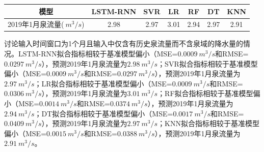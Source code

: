 \begin{table}[!htbp]
  \centering
  \label{tab:spr_pre_only_out_1}
  \footnotesize
  \renewcommand{\arraystretch}{1}
  \begin{tabular}{ccccccc}
    \toprule
    模型 & LSTM-RNN & SVR & LR & RF & DT & KNN\\
    \midrule 
    2019年1月泉流量($\SI{}{m^{3}/s}$) & 2.98 & 2.97 & 3.01 & 2.94 & 2.97 & 2.91 \\
    \bottomrule
  \end{tabular}
\end{table}

讨论输入时间窗口为1个月且输入中仅含有历史泉流量而不含泉域的降水量的情况。LSTM-RNN拟合指标相较于基准模型偏小（MSE=$\SI{0.0009}{m^{3}/s}$和RMSE=$\SI{0.0297}{m^{3}/s}$），预测2019年1月泉流量为$\SI{2.98}{m^{3}/s}$；SVR拟合指标相较于基准模型偏小（MSE=$\SI{0.0009}{m^{3}/s}$和RMSE=$\SI{0.0297}{m^{3}/s}$），预测2019年1月泉流量为$\SI{2.97}{m^{3}/s}$；LR拟合指标相较于基准模型偏小（MSE=$\SI{0.0009}{m^{3}/s}$和RMSE=$\SI{0.0306}{m^{3}/s}$），预测2019年1月泉流量为$\SI{3.01}{m^{3}/s}$；RF拟合指标相较于基准模型偏小（MSE=$\SI{0.0014}{m^{3}/s}$和RMSE=$\SI{0.0374}{m^{3}/s}$），预测2019年1月泉流量为$\SI{2.94}{m^{3}/s}$；DT拟合指标相较于基准模型偏小（MSE=$\SI{0.0017}{m^{3}/s}$和RMSE=$\SI{0.0409}{m^{3}/s}$），预测2019年1月泉流量为$\SI{2.97}{m^{3}/s}$；KNN拟合指标相较于基准模型偏小（MSE=$\SI{0.0015}{m^{3}/s}$和RMSE=$\SI{0.0388}{m^{3}/s}$），预测2019年1月泉流量为$\SI{2.91}{m^{3}/s}$。

